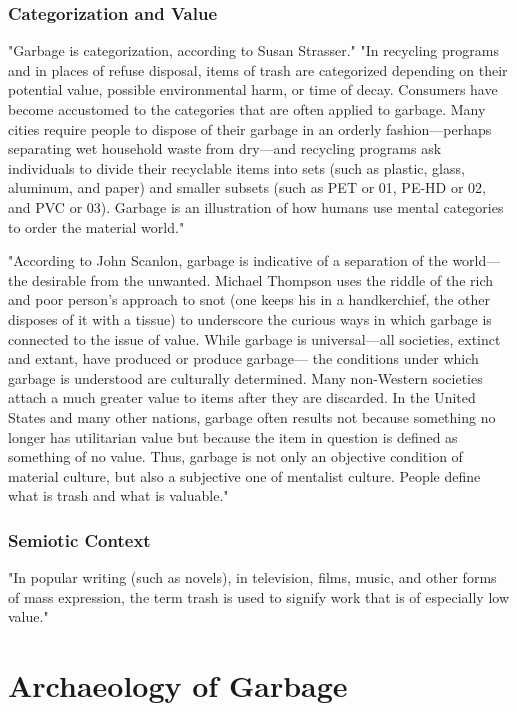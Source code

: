 %
\subsubsection{Categorization and Value}
"Garbage is categorization, according to Susan Strasser." "In recycling programs and in places of refuse disposal, items of trash are categorized depending on their potential value, possible environmental harm, or time of decay. Consumers have become accustomed to the categories that are often applied to garbage. Many cities require people to dispose of their garbage in an orderly fashion---perhaps separating wet household waste from dry---and recycling programs ask individuals to divide their recyclable items into sets (such as plastic, glass, aluminum, and paper) and smaller subsets (such as PET or 01, PE-HD or 02, and PVC or 03). Garbage is an illustration of how humans use mental categories to order the material world." \cite{lukas2012garbage}

"According to John Scanlon, garbage is indicative of a separation of the world---the desirable from the unwanted. Michael Thompson uses the riddle of the rich and poor person’s approach to snot (one keeps his in a handkerchief, the other disposes of it with a tissue) to underscore the curious ways in which garbage is connected to the issue of value. While garbage is universal---all societies, extinct and extant, have produced or produce garbage--- the conditions under which garbage is understood are culturally determined. Many non-Western societies attach a much greater value to items after they are discarded. In the United States and many other nations, garbage often results not because something no longer has utilitarian value but because the item in question is defined as something of no value. Thus, garbage is not only an objective condition of material culture, but also a subjective one of mentalist culture. People define what is trash and what is valuable." \cite{lukas2012garbage}

%
\subsubsection{Semiotic Context}
"In popular writing (such as novels), in television, films, music, and other forms of mass expression, the term trash is used to signify work that is of especially low value." \cite{lukas2012garbage}

\section{Archaeology of Garbage}


